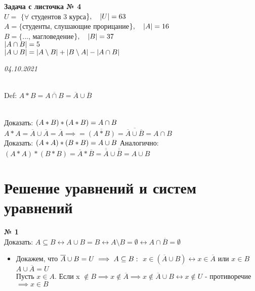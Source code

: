 \documentclass[12pt]{article}
\DeclarePairedDelimiter\abs{\lvert}{\rvert}%
\begin{document}
\newpage
{
	{\textbf{Задача с листочка № 4} \vspace{.5cm}\\}
	$U =$ $\{\forall$ студентов 3 курса$\}, \quad \abs{U} = 63$\\
	$A = \{$студенты, слушающие прорицание$\}, \quad \abs{A} = 16$\\
	$B = \{$..., магловедение$\}, \quad \abs{B} = 37$\\
	$\abs{A \cap B} = 5$\\

	$\\\abs{A \cup B} = \abs{A \setminus B} + \abs{B \setminus A} - \abs{A \cap B}$
	
	
	
}
{\hfill \textit{04.10.2021}\\ \vspace{.2cm}\\}
{
Def: $A * B = \overline{A \cap B} = \overline{A} \cup \overline{B}$              

\\
Доказать: $(A * B) * (A * B) = A \cap B\\$
$A * A = \overline{A} \cup \overline{A} = \overline{A} \implies = \overline{(A * B)} = 
\overline{\overline{A} \cup \overline{B}} = A \cap B$\\
Доказать: $(A * A) * (B * B) = A \cup B\\$
Аналогично: $(A * A) * (B * B) = \overline{A} * \overline{B} = \overline{\overline{A}} \cup \overline{\overline{B}} = A \cup B$
}

\section{Решение уравнений и систем уравнений}
\vspace{.5cm}
{
	{\textbf{№ 1} \vspace{.5cm}\\}
	\large{ Доказать: $A \subseteq B \leftrightarrow A \cup B = B \leftrightarrow A \setminus B = \emptyset \leftrightarrow A \cap \overline{B} = \emptyset$\\}
	\begin{itemize}
		\item {Докажем, что $\overline{A} \cup B = U \implies A \subseteq B:\\$
			$x \in (\overline{A} \cup B) \leftrightarrow x \in \overline{A} \text{ или } x \in B$\\
			$A \cup \overline{A} = U$\\
			Пусть $x \in A$. Если x $\notin B \implies x \notin \overline{A} \implies x \notin \overline{A} \cup B \leftrightarrow x \notin U$ - противоречие $\implies x \in B$ 
		}
	\end{itemize}

	
}
\end{document}
